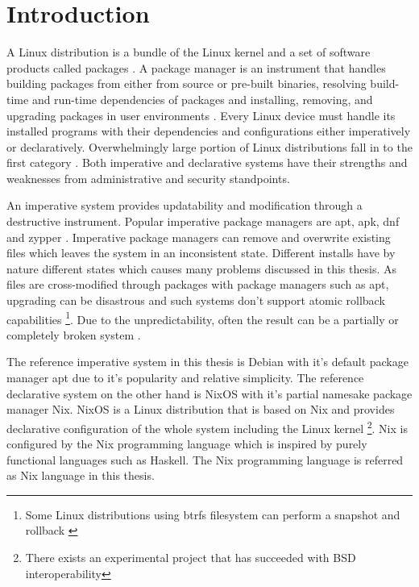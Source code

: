 \chapter{Introduction} \label{johdanto}

A Linux distribution is a bundle of the Linux kernel and a set of
software products called packages \cite{gnuPackagesx2014}. A package
manager is an instrument that handles building packages from either
from source or pre-built binaries, resolving build-time and run-time
dependencies of packages and installing, removing, and upgrading
packages in user environments \cite{gnuPackagesx2014}. Every Linux
device must handle its installed programs with their dependencies and
configurations either imperatively or declaratively. Overwhelmingly
large portion of Linux distributions fall in to the first category
\cite{dolstra2008nixos}. Both imperative and declarative systems have
their strengths and weaknesses from administrative and security
standpoints.

An imperative system provides updatability and modification through a
destructive instrument. Popular imperative package managers are apt,
apk, dnf and zypper \cite{dolstra2008nixos}. Imperative package
managers can remove and overwrite existing files which leaves the
system in an inconsistent state. Different installs have by nature
different states which causes many problems discussed in this
thesis. As files are cross-modified through packages with package
managers such as apt, upgrading can be disastrous and such systems
don't support atomic rollback capabilities \footnote{Some Linux
distributions using btrfs filesystem can perform a snapshot and
rollback \cite{opensuseSystemRecovery}}. Due to the unpredictability,
often the result can be a partially or completely broken system
\cite{dolstra2008nixos}.

The reference imperative system in this thesis is Debian with it's
default package manager apt due to it's popularity and relative
simplicity. The reference declarative system on the other hand is
NixOS with it's partial namesake package manager Nix. NixOS is a Linux
distribution that is based on Nix and provides declarative
configuration of the whole system including the Linux
kernel \footnote{There exists an experimental project that has
succeeded with BSD interoperability}. Nix is configured by the Nix
programming language which is inspired by purely functional languages
such as Haskell. The Nix programming language is referred as Nix
language in this thesis. \cite{van2013reference}

